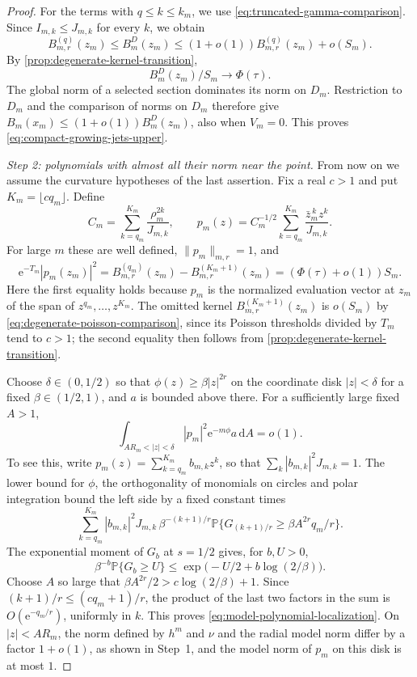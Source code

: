 \begin{proof}
For the terms with $q\leq k\leq k_m$, we use \eqref{eq:truncated-gamma-comparison}. Since $I_{m,k}\leq J_{m,k}$ for every $k$, we obtain
\[
 B_{m,r}^{(q)}(z_m)\leq B_m^{D}(z_m)
 \leq(1+o(1))B_{m,r}^{(q)}(z_m)+o(S_m).
\]
By \cref{prop:degenerate-kernel-transition},
\begin{equation}\label{eq:shrinking-disc-transition}
 B_m^{D}(z_m)/S_m\longrightarrow\Phi(\tau).
\end{equation}
The global norm of a selected section dominates its norm on $D_m$. Restriction to $D_m$ and the comparison of norms on $D_m$ therefore give
$B_m(x_m)\leq(1+o(1))B_m^D(z_m)$, also when $V_m=0$. This proves \eqref{eq:compact-growing-jets-upper}.

\emph{Step 2: polynomials with almost all their norm near the point.}
From now on we assume the curvature hypotheses of the last assertion. Fix a real $c>1$ and put $K_m=\lfloor cq_m\rfloor$. Define
\[
 C_m=\sum_{k=q_m}^{K_m}\frac{\rho_m^{2k}}{J_{m,k}},\qquad
 p_m(z)=C_m^{-1/2}\sum_{k=q_m}^{K_m}
                   \frac{\bar z_m^{\,k}z^k}{J_{m,k}}.
\]
For large $m$ these are well defined, $\|p_m\|_{m,r}=1$, and
\begin{equation}\label{eq:model-polynomial-value}
 \mathrm{e}^{-T_m}|p_m(z_m)|^2
 =B_{m,r}^{(q_m)}(z_m)-B_{m,r}^{(K_m+1)}(z_m)
 =(\Phi(\tau)+o(1))S_m.
\end{equation}
Here the first equality holds because $p_m$ is the normalized evaluation vector at $z_m$ of the span of $z^{q_m},\ldots,z^{K_m}$. The omitted kernel $B_{m,r}^{(K_m+1)}(z_m)$ is $o(S_m)$ by \eqref{eq:degenerate-poisson-comparison}, since its Poisson thresholds divided by $T_m$ tend to $c>1$; the second equality then follows from \cref{prop:degenerate-kernel-transition}.

Choose $\delta\in(0,1/2)$ so that $\phi(z)\geq\beta|z|^{2r}$ on the coordinate disk $|z|<\delta$ for a fixed $\beta\in(1/2,1)$, and $a$ is bounded above there. For a sufficiently large fixed $A>1$,
\begin{equation}\label{eq:model-polynomial-localization}
 \int_{A R_m<|z|<\delta}|p_m|^2\mathrm{e}^{-m\phi}a\,\mathrm{d}A=o(1).
\end{equation}
To see this, write $p_m(z)=\sum_{k=q_m}^{K_m}b_{m,k}z^k$, so that
$\sum_k|b_{m,k}|^2J_{m,k}=1$. The lower bound for $\phi$, the orthogonality of monomials on circles and polar integration bound the left side by a fixed constant times
\[
 \sum_{k=q_m}^{K_m}|b_{m,k}|^2J_{m,k}\,
 \beta^{-(k+1)/r}
 \mathbb P\{G_{(k+1)/r}\geq\beta A^{2r}q_m/r\}.
\]
The exponential moment of $G_b$ at $s=1/2$ gives, for $b,U>0$,
\[
 \beta^{-b}\mathbb P\{G_b\geq U\}
 \leq\exp\bigl(-U/2+b\log(2/\beta)\bigr).
\]
Choose $A$ so large that $\beta A^{2r}/2>c\log(2/\beta)+1$. Since $(k+1)/r\leq(cq_m+1)/r$, the product of the last two factors in the sum is $O(\mathrm{e}^{-q_m/r})$, uniformly in $k$. This proves \eqref{eq:model-polynomial-localization}. On $|z|<A R_m$, the norm defined by $h^m$ and $\nu$ and the radial model norm differ by a factor $1+o(1)$, as shown in Step~1, and the model norm of $p_m$ on this disk is at most $1$.


\end{proof}
